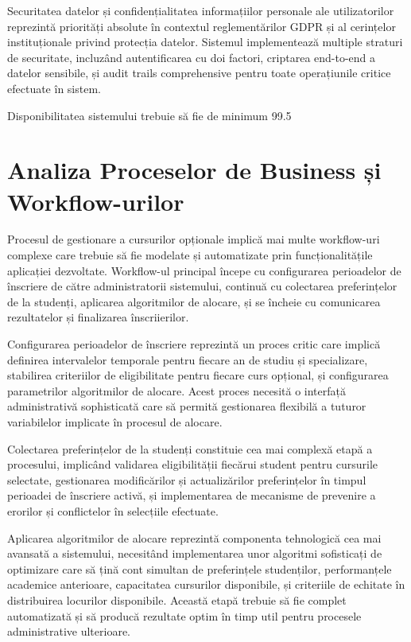\documentclass[12pt,a4paper]{report}
\begin{document}
Securitatea datelor și confidențialitatea informațiilor personale ale utilizatorilor reprezintă priorități absolute în contextul reglementărilor GDPR și al cerințelor instituționale privind protecția datelor. Sistemul implementează multiple straturi de securitate, incluzând autentificarea cu doi factori, criptarea end-to-end a datelor sensibile, și audit trails comprehensive pentru toate operațiunile critice efectuate în sistem.

Disponibilitatea sistemului trebuie să fie de minimum 99.5%

\section{Analiza Proceselor de Business și Workflow-urilor}

Procesul de gestionare a cursurilor opționale implică mai multe workflow-uri complexe care trebuie să fie modelate și automatizate prin funcționalitățile aplicației dezvoltate. Workflow-ul principal începe cu configurarea perioadelor de înscriere de către administratorii sistemului, continuă cu colectarea preferințelor de la studenți, aplicarea algoritmilor de alocare, și se încheie cu comunicarea rezultatelor și finalizarea înscriierilor.

Configurarea perioadelor de înscriere reprezintă un proces critic care implică definirea intervalelor temporale pentru fiecare an de studiu și specializare, stabilirea criteriilor de eligibilitate pentru fiecare curs opțional, și configurarea parametrilor algoritmilor de alocare. Acest proces necesită o interfață administrativă sophisticată care să permită gestionarea flexibilă a tuturor variabilelor implicate în procesul de alocare.

Colectarea preferințelor de la studenți constituie cea mai complexă etapă a procesului, implicând validarea eligibilității fiecărui student pentru cursurile selectate, gestionarea modificărilor și actualizărilor preferințelor în timpul perioadei de înscriere activă, și implementarea de mecanisme de prevenire a erorilor și conflictelor în selecțiile efectuate.

Aplicarea algoritmilor de alocare reprezintă componenta tehnologică cea mai avansată a sistemului, necesitând implementarea unor algoritmi sofisticați de optimizare care să țină cont simultan de preferințele studenților, performanțele academice anterioare, capacitatea cursurilor disponibile, și criteriile de echitate în distribuirea locurilor disponibile. Această etapă trebuie să fie complet automatizată și să producă rezultate optim în timp util pentru procesele administrative ulterioare.
\end{document}
